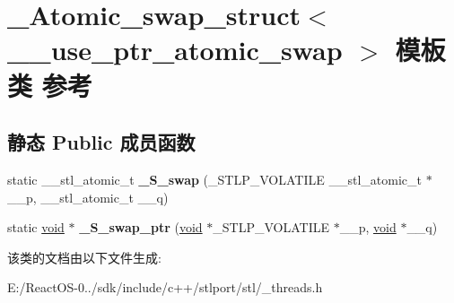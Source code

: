 \hypertarget{class___atomic__swap__struct}{}\section{\+\_\+\+Atomic\+\_\+swap\+\_\+struct$<$ \+\_\+\+\_\+use\+\_\+ptr\+\_\+atomic\+\_\+swap $>$ 模板类 参考}
\label{class___atomic__swap__struct}
\subsection*{静态 Public 成员函数}
\begin{DoxyCompactItemize}
\item 
\mbox{\label{class___atomic__swap__struct_a212f6258f4f6b814cdf2f0209178f837}} 
static \+\_\+\+\_\+stl\+\_\+atomic\+\_\+t {\bfseries \+\_\+\+S\+\_\+swap} (\+\_\+\+S\+T\+L\+P\+\_\+\+V\+O\+L\+A\+T\+I\+LE \+\_\+\+\_\+stl\+\_\+atomic\+\_\+t $\ast$\+\_\+\+\_\+p, \+\_\+\+\_\+stl\+\_\+atomic\+\_\+t \+\_\+\+\_\+q)
\item 
\mbox{\label{class___atomic__swap__struct_adc3899490cb1503f08c65d4896fbeffa}} 
static \hyperlink{interfacevoid}{void} $\ast$ {\bfseries \+\_\+\+S\+\_\+swap\+\_\+ptr} (\hyperlink{interfacevoid}{void} $\ast$\+\_\+\+S\+T\+L\+P\+\_\+\+V\+O\+L\+A\+T\+I\+LE $\ast$\+\_\+\+\_\+p, \hyperlink{interfacevoid}{void} $\ast$\+\_\+\+\_\+q)
\end{DoxyCompactItemize}


该类的文档由以下文件生成\+:\begin{DoxyCompactItemize}
\item 
E\+:/\+React\+O\+S-\/0../sdk/include/c++/stlport/stl/\+\_\+threads.\+h\end{DoxyCompactItemize}
